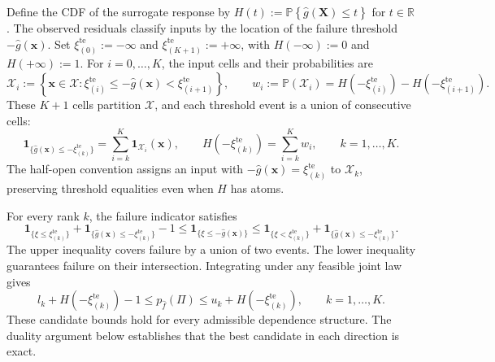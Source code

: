 \documentclass[review,11pt,3p,authoryear,nopreprintline]{elsarticle}
\begin{document}
Define the CDF of the surrogate response by $H(t):=\mathbb P\left\{\hat g(\bm X)\le t\right\}$ for $t\in\mathbb R$. The observed residuals classify inputs by the location of the failure threshold $-\hat g(\bm x)$. Set $\xi_{(0)}^{\mathrm{te}}:=-\infty$ and $\xi_{(K+1)}^{\mathrm{te}}:=+\infty$, with $H(-\infty):=0$ and $H(+\infty):=1$. For $i=0,\ldots,K$, the input cells and their probabilities are
\begin{equation}
  \mathcal X_i:=\left\{\bm x\in\mathcal X:
    \xi_{(i)}^{\mathrm{te}}\le-\hat g(\bm x)<\xi_{(i+1)}^{\mathrm{te}}\right\},
  \qquad
  w_i:=\mathbb P(\mathcal X_i)
    =H\left(-\xi_{(i)}^{\mathrm{te}}\right)-H\left(-\xi_{(i+1)}^{\mathrm{te}}\right).
  \label{eq-input-cells}
\end{equation}
These $K+1$ cells partition $\mathcal X$, and each threshold event is a union of consecutive cells:
\[
  \mathbf1_{\{\hat g(\bm x)\le-\xi_{(k)}^{\mathrm{te}}\}}
    =\sum_{i=k}^K\mathbf1_{\mathcal X_i}(\bm x),
  \qquad
  H\left(-\xi_{(k)}^{\mathrm{te}}\right)=\sum_{i=k}^K w_i,
  \qquad k=1,\ldots,K.
\]
The half-open convention assigns an input with $-\hat g(\bm x)=\xi_{(k)}^{\mathrm{te}}$ to $\mathcal X_k$, preserving threshold equalities even when $H$ has atoms.

For every rank $k$, the failure indicator satisfies 
\[
  \mathbf1_{\{\xi\le\xi_{(k)}^{\mathrm{te}}\}}
    +\mathbf1_{\{\hat g(\bm x)\le-\xi_{(k)}^{\mathrm{te}}\}}-1
  \le\mathbf1_{\{\xi\le-\hat g(\bm x)\}}
  \le\mathbf1_{\{\xi<\xi_{(k)}^{\mathrm{te}}\}}
    +\mathbf1_{\{\hat g(\bm x)\le-\xi_{(k)}^{\mathrm{te}}\}}.
\]
The upper inequality covers failure by a union of two events. The lower inequality guarantees failure on their intersection. Integrating under any feasible joint law gives
\begin{equation*}
  l_k+H\left(-\xi_{(k)}^{\mathrm{te}}\right)-1\le p_{\hat f}(\Pi)\le u_k+H\left(-\xi_{(k)}^{\mathrm{te}}\right),
  \qquad k=1,\ldots,K.
\end{equation*}
These candidate bounds hold for every admissible dependence structure. The duality argument below establishes that the best candidate in each direction is exact.
\end{document}
